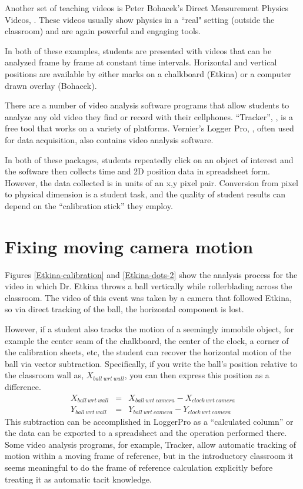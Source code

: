 \documentclass[12pt]{iopart}
\newcommand{\bea}{\begin{eqnarray}}
\newcommand{\eea}{\end{eqnarray}}
\begin{document}
Another set of teaching videos is Peter Bohacek's Direct Measurement Physics Videos, \cite{Bohacek_overview} .
These videos usually show physics in a ``real" setting (outside the classroom) and are again powerful and engaging tools.  

In both of these examples, students are presented with videos that can be analyzed frame by frame at constant time intervals.  Horizontal and vertical positions are available by either marks on a chalkboard (Etkina) or a computer drawn overlay (Bohacek).  

There are a number of video analysis software programs that allow students to analyze any old video they find or record with their cellphones.  ``Tracker'', \cite{Tracker}, is a free tool that works on a variety of platforms. Vernier's Logger Pro, \cite{LoggerPro}, often used for data acquisition, also contains video analysis software.  

In both of these packages, students repeatedly click on an object of interest and the software then collects time and 2D position data  in spreadsheet form.  However, the data collected is in units of an x,y pixel pair.  Conversion from pixel to physical dimension is a student task, and the quality of student results can depend on the ``calibration stick''\cite{calibration_stick} they employ.

\section{Fixing moving camera motion} 
Figures \ref{Etkina-calibration} and \ref{Etkina-dots-2} show the analysis process for the video in which Dr. Etkina throws a ball vertically while rollerblading across the classroom.  The video of this event was taken by a camera that followed Etkina, so via direct tracking of the ball, the horizontal component is lost.

However, if a student also tracks the motion of a seemingly immobile object, for example the center seam of the chalkboard, the center of the clock, a corner of the calibration sheets, etc, the student can recover the horizontal motion of the ball via vector subtraction.  Specifically, if you write  the ball's position relative to the classroom wall as, $X_{ball~wrt~wall}$, you can then express this position as a difference.
\bea
X_{ball~wrt~wall} &=& X_{ball~wrt~camera}-X_{clock~wrt~camera} \nonumber\\ 
Y_{ball~wrt~wall} &=& Y_{ball~wrt~camera}-Y_{clock~wrt~camera}\nonumber
\eea
This subtraction can be accomplished in LoggerPro as a ``calculated column'' or the data can be exported to a spreadsheet and the operation performed there.  Some video analysis programs, for example, Tracker, allow automatic tracking of motion within a moving frame of reference\cite{tracker_planets}, but in the introductory classroom it seems meaningful to do the frame of reference calculation explicitly before treating it as automatic tacit knowledge.
\end{document}
